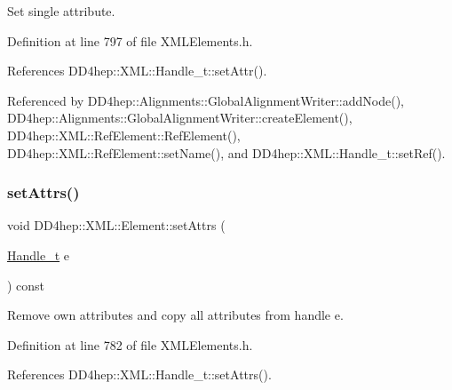 Set single attribute. 



Definition at line 797 of file X\+M\+L\+Elements.\+h.



References D\+D4hep\+::\+X\+M\+L\+::\+Handle\+\_\+t\+::set\+Attr().



Referenced by D\+D4hep\+::\+Alignments\+::\+Global\+Alignment\+Writer\+::add\+Node(), D\+D4hep\+::\+Alignments\+::\+Global\+Alignment\+Writer\+::create\+Element(), D\+D4hep\+::\+X\+M\+L\+::\+Ref\+Element\+::\+Ref\+Element(), D\+D4hep\+::\+X\+M\+L\+::\+Ref\+Element\+::set\+Name(), and D\+D4hep\+::\+X\+M\+L\+::\+Handle\+\_\+t\+::set\+Ref().

\hypertarget{class_d_d4hep_1_1_x_m_l_1_1_element_a8209334be87a35551bbd6d4d8f7cbba4}{}\label{class_d_d4hep_1_1_x_m_l_1_1_element_a8209334be87a35551bbd6d4d8f7cbba4} 
\subsubsection{\texorpdfstring{set\+Attrs()}{setAttrs()}}
{\footnotesize\ttfamily void D\+D4hep\+::\+X\+M\+L\+::\+Element\+::set\+Attrs (\begin{DoxyParamCaption}\item[{\hyperlink{class_d_d4hep_1_1_x_m_l_1_1_handle__t}{Handle\+\_\+t}}]{e }\end{DoxyParamCaption}) const\hspace{0.3cm}{\ttfamily [inline]}}



Remove own attributes and copy all attributes from handle \textquotesingle{}e\textquotesingle{}. 



Definition at line 782 of file X\+M\+L\+Elements.\+h.



References D\+D4hep\+::\+X\+M\+L\+::\+Handle\+\_\+t\+::set\+Attrs().

\hypertarget{class_d_d4hep_1_1_x_m_l_1_1_element_acb67377082cda6f8405fc161d6f016d0}{}\label{class_d_d4hep_1_1_x_m_l_1_1_element_acb67377082cda6f8405fc161d6f016d0} 
